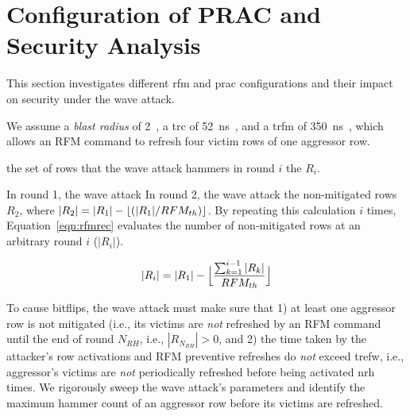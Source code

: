 \section{Configuration of PRAC and Security Analysis}
\label{sec:configurationandsecurity}
This section investigates different \gls{rfm} and \gls{prac} configurations and their impact on security under the wave attack.

 We assume
a \emph{blast radius} of 2~\cite{kogler2022half},
a \gls{trc} of \SI{52}{\nano\second}~\cite{jedec2024jesd795c},
and a \gls{trfm} of \SI{350}{\nano\second}~\cite{jedec2024jesd795c}, which allows an RFM command to refresh four victim rows of one aggressor row.

  the set of rows that the wave attack hammers in round $i$  the  $R_i$.

In round 1, the wave attack 
In round 2, the wave attack  the non-mitigated rows $R_2$, where $|R_2| = |R_1| - \lfloor ({|R_1|}/{RFM_{th}{}}) \rfloor$.
By repeating this calculation $i$ times, Equation~\ref{eqn:rfmrec} evaluates the number of non-mitigated rows at an arbitrary round $i$ ($|R_{i}|$). 

\vspace{-8pt}
\begin{equation}
\label{eqn:rfmrec}
|R_{i}| = |R_{1}| - 
\Bigl\lfloor
\frac{
\sum_{k=1}^{i-1} |R_{k}|
}{
RFM_{th}
}
\Bigr\rfloor
\end{equation}

\vspace{2pt}
To cause bitflips, the wave attack must make sure that 1) at least one aggressor row is not mitigated (i.e., its victims are \emph{not} refreshed by an RFM command until the end of round $N_{RH}$, i.e., $|R_{N_{RH}}| > 0$, and 2) the time taken by the attacker's row activations and RFM preventive refreshes do \emph{not} exceed \gls{trefw}, i.e., aggressor's victims are \emph{not} periodically refreshed before being activated \gls{nrh} times.
We rigorously sweep the wave attack's parameters and identify the maximum hammer count of an aggressor row before its victims are refreshed.

